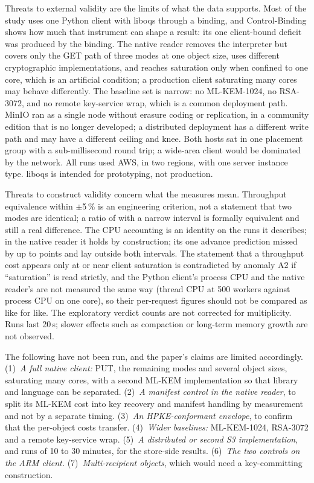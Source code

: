 \documentclass[conference]{IEEEtran}
\newcommand{\lab}[1]{\textsf{#1}}
\begin{document}
Threats to external validity are the limits of what the data supports. Most of the study uses one
Python client with liboqs through a binding, and \lab{Control-Binding} shows how much that instrument can
shape a result: its one client-bound deficit was produced by the binding. The native reader
removes the interpreter but covers only the GET path of three modes at one object size, uses
different cryptographic implementations, and reaches saturation only when confined to one core,
which is an artificial condition; a production client saturating many cores may behave
differently. The baseline set is narrow: no ML-KEM-1024, no RSA-3072, and no remote
key-service wrap, which is a common deployment path. MinIO ran as a single node without erasure
coding or replication, in a community edition that is no longer developed; a distributed
deployment has a different write path and may have a different ceiling and knee. Both hosts sat
in one placement group with a sub-millisecond round trip; a wide-area client would be dominated
by the network. All runs used AWS, in two regions, with one server instance type. liboqs is
intended for prototyping, not production.

Threats to construct validity concern what the measures mean. Throughput equivalence within $\pm$5\,\% is an engineering criterion, not a
statement that two modes are identical; a ratio of \RevHotRatio{} with a narrow interval is
formally equivalent and still a real difference. The CPU accounting is an identity on the runs
it describes; in the native reader it holds by construction; its one advance prediction missed
by up to \AudPredictionErrorL{} points and lay outside both intervals. The statement that a
throughput cost appears only at or near client saturation is contradicted by anomaly A2 if
``saturation'' is read strictly, and the Python client's process CPU and the native reader's
are not measured the same way (thread CPU at 500 workers against process CPU on one core), so
their per-request figures should not be compared as like for like. The exploratory verdict counts are not corrected for
multiplicity. Runs last 20\,s; slower effects such as compaction or long-term memory growth are
not observed.

The following have not been run, and the paper's claims are limited accordingly.
(1)~\emph{A full native client:} PUT, the remaining modes and several object sizes, saturating
many cores, with a second ML-KEM implementation so that library and language can be separated.
(2)~\emph{A manifest control in the native reader}, to split its ML-KEM cost into key recovery
and manifest handling by measurement and not by a separate timing.
(3)~\emph{An HPKE-conformant envelope}, to confirm that the per-object costs transfer.
(4)~\emph{Wider baselines:} ML-KEM-1024, RSA-3072 and a remote key-service wrap.
(5)~\emph{A distributed or second S3 implementation}, and runs of 10 to 30 minutes, for the
store-side results.
(6)~\emph{The two controls on the ARM client.}
(7)~\emph{Multi-recipient objects}, which would need a key-committing construction.
\end{document}
